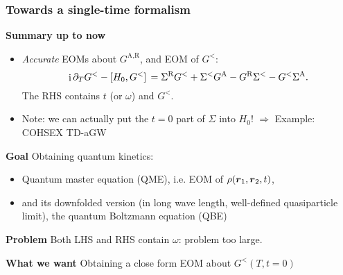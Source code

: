 \documentclass[t]{beamer}
\DeclareMathOperator{\ii}{i}
\begin{document}
\begin{frame}
    \frametitle{Towards a single-time formalism}
    
    \textbf{Summary up to now} \begin{itemize}
        \item \emph{Accurate} EOMs about $G^{\text{A}, \text{R}}$, and EOM of $G^<$: 
        \begin{equation}
            \ii \partial_T G^< - \comm*{H_0}{G^<} = 
            \Sigma^{\text{R}} G^< + \Sigma^< G^{\text{A}} - G^{\text{R}} \Sigma^< - G^< \Sigma^{\text{A}}.
        \end{equation}
        The RHS contains $t$ (or $\omega$) and $G^<$.
        \item Note: we can actually put the $t=0$ part of $\Sigma$ into $H_0$!
            $\Rightarrow$ Example: COHSEX TD-aGW
    \end{itemize}

    \vspace{0.25cm}

    \textbf{Goal} Obtaining quantum kinetics: 
    \begin{itemize}
        \item Quantum master equation (QME), i.e. EOM of $\rho(\vb*{r}_1, \vb*{r}_2, t)$,
        \item and its downfolded version (in long wave length, well-defined quasiparticle limit), 
        the quantum Boltzmann equation (QBE)
    \end{itemize} 
    
    \vspace{0.25cm}

    \textbf{Problem} Both LHS and RHS contain $\omega$: problem too large. 

    \textbf{What we want} Obtaining a close form EOM about $G^<(T, t=0)$

\end{frame}
\end{document}
